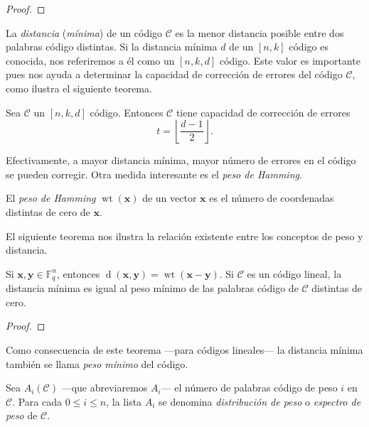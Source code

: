 \begin{proof}
  
\end{proof}

La \textit{distancia} (\textit{mínima}) de un código \(\mathcal C\) es la menor distancia posible entre dos palabras código distintas. 
Si la distancia mínima \(d\) de un \([n,k]\) código es conocida, nos referiremos a él como un \([n,k,d]\) código.
Este valor es importante pues nos ayuda a determinar la capacidad de corrección de errores del código \(\mathcal C\), como ilustra el siguiente teorema.

\begin{theorem}
  Sea \(\mathcal C\) un \([n, k, d]\) código. Entonces \(\mathcal C\) tiene capacidad de corrección de errores \[
    t = \left\lfloor \frac{d - 1}{2} \right\rfloor.
  \]
\end{theorem}


Efectivamente, a mayor distancia mínima, mayor número de errores en el código se pueden corregir.
Otra medida interesante es el \textit{peso de Hamming}.

\begin{definition}
  El \textit{peso de Hamming} \(\operatorname{wt}(\symbf{x})\) de un vector \(\symbf{x}\) es el número de coordenadas distintas de cero de \(\symbf{x}\).
\end{definition}

El siguiente teorema nos ilustra la relación existente entre los conceptos de peso y distancia.

\begin{theorem}
  Si \(\symbf{x}, \symbf{y} \in \mathbb F_q^n\), entonces \(\operatorname{d}(\symbf{x}, \symbf{y}) = \operatorname{wt}(\symbf{x} - \symbf{y})\).
  Si \(\mathcal C\) es un código lineal, la distancia mínima es igual al peso mínimo de las palabras código de \(\mathcal C\) distintas de cero.
\end{theorem}

\begin{proof}
  
\end{proof}

Como consecuencia de este teorema —para códigos lineales— la distancia mínima también se llama \textit{peso mínimo} del código.

\begin{definition}
  Sea \(A_i(\mathcal C)\) —que abreviaremos \(A_i\)— el número de palabras código de peso \(i\) en \(\mathcal C\).
  Para cada \(0 \leq i \leq n\), la lista \(A_i\) se denomina \textit{distribución de peso} o \textit{espectro de peso} de \(\mathcal C\).
\end{definition}


